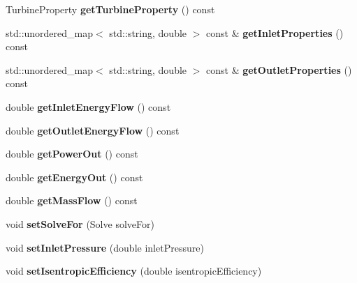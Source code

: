 \begin{DoxyCompactItemize}
Turbine\+Property {\bfseries get\+Turbine\+Property} () const
\item 
\mbox{\label{class_turbine_a575f5527de69f57d4f344f3c66ee898d}} 
std\+::unordered\+\_\+map$<$ std\+::string, double $>$ const  \& {\bfseries get\+Inlet\+Properties} () const
\item 
\mbox{\label{class_turbine_ae6ac54bac33feff9d06800acdefacf9d}} 
std\+::unordered\+\_\+map$<$ std\+::string, double $>$ const  \& {\bfseries get\+Outlet\+Properties} () const
\item 
\mbox{\label{class_turbine_ae5d55a7b882e4780d490d43409f8f06c}} 
double {\bfseries get\+Inlet\+Energy\+Flow} () const
\item 
\mbox{\label{class_turbine_aa20c0f9dd81cd9bfd5eda77f588516b5}} 
double {\bfseries get\+Outlet\+Energy\+Flow} () const
\item 
\mbox{\label{class_turbine_a89585cc2fbfdbe67d539eae08c369fa2}} 
double {\bfseries get\+Power\+Out} () const
\item 
\mbox{\label{class_turbine_a143fc660274e0d65ccb8fc55cc2caf83}} 
double {\bfseries get\+Energy\+Out} () const
\item 
\mbox{\label{class_turbine_a4893a203dbbf9db9ca77a0b278c4c118}} 
double {\bfseries get\+Mass\+Flow} () const
\item 
\mbox{\label{class_turbine_a96f54a8fc572dae6c5298289de890f4d}} 
void {\bfseries set\+Solve\+For} (Solve solve\+For)
\item 
\mbox{\label{class_turbine_a04996baab9a40d449a69c737c00be8e4}} 
void {\bfseries set\+Inlet\+Pressure} (double inlet\+Pressure)
\item 
\mbox{\label{class_turbine_ae67daa481ef48bcf8aef84bcccb4611d}} 
void {\bfseries set\+Isentropic\+Efficiency} (double isentropic\+Efficiency)
\item 
\mbox{\label{class_turbine_a51e9c5050a5be51b86dc23e690bd3f40}} 

\end{DoxyCompactItemize}
